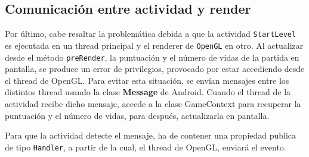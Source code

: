\subsection{Comunicación entre actividad y render}

Por último, cabe resaltar la problemática debida a que la actividad \texttt{StartLevel} es ejecutada en un thread principal y el renderer de \texttt{OpenGL} en otro. Al actualizar desde el método \texttt{preRender}, la puntuación y el número de vidas de la partida en pantalla,  se produce un error de privilegios, provocado por estar accediendo desde el thread de OpenGL. Para evitar esta situación, se envían mensajes entre los distintos thread usando la clase \textbf{Message} de Android. Cuando el thread de la actividad recibe dicho mensaje, accede a la clase GameContext para recuperar la puntuación y el número de vidas, para después, actualizarla en pantalla.
\newline

Para que la actividad detecte el mensaje, ha de contener una propiedad publica de tipo \texttt{Handler}, a partir de la cual, el thread de OpenGL, enviará el evento.




